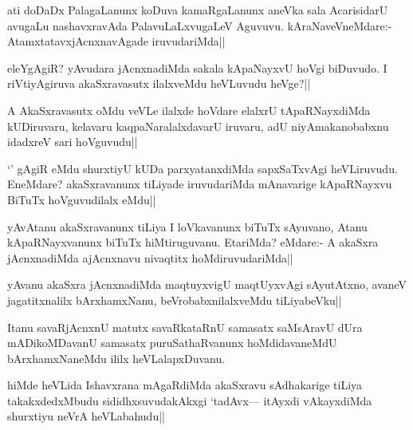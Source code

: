 \stext


\begin{artha}
ati doDaDx PalagaLanunx koDuva kamaRgaLanunx aneVka sala AcarisidarU avugaLu nashavxravAda PalavuLaLxvugaLeV Aguvuvu. kAraNaveVneMdare:- AtamxtatavxjAcnxnavAgade iruvudariMda||
\end{artha}

\begin{artha}
eleYgAgiR? yAvudara jAcnxnadiMda sakala kApaNayxvU hoVgi biDuvudo. I riVtiyAgiruva akaSxravasutx ilalxveMdu heVLuvudu heVge?||
\end{artha}

\begin{artha}
A AkaSxravasutx oMdu veVLe ilalxde hoVdare elalxrU tApaRNayxdiMda kUDiruvaru, kelavaru kaqpaNaralalxdavarU iruvaru, adU niyAmakanobabxnu idadxreV sari hoVguvudu||
\end{artha}

\begin{artha}
`\stext ' gAgiR eMdu shurxtiyU kUDa parxyatanxdiMda sapxSaTxvAgi heVLiruvudu. EneMdare? akaSxravanunx tiLiyade iruvudariMda mAnavarige kApaRNayxvu BiTuTx hoVguvudilalx eMdu||
\end{artha}

\begin{artha}%
yAvAtanu akaSxravanunx tiLiya I loVkavanunx biTuTx sAyuvano, Atanu kApaRNayxvanunx biTuTx hiMtiruguvanu. EtariMda? eMdare:- A akaSxra jAcnxnadiMda ajAcnxnavu nivaqtitx hoMdiruvudariMda||
\end{artha}

\begin{artha}
yAvanu akaSxra jAcnxnadiMda maqtuyxvigU maqtUyxvAgi sAyutAtxno, avaneV jagatitxnalilx bArxhamxNanu, beVrobabxnilalxveMdu tiLiyabeVku||
\end{artha}


\begin{artha}
Itanu savaRjAcnxnU matutx savaRkataRnU samasatx saMsAravU dUra mADikoMDavanU samasatx puruSathaRvanunx hoMdidavaneMdU bArxhamxNaneMdu ililx heVLalapxDuvanu.
\end{artha}

\begin{artha}
hiMde heVLida Ishavxrana mAgaRdiMda akaSxravu sAdhakarige tiLiya takakxdedxMbudu sididhxsuvudakAkxgi `tadAvx--- itAyxdi vAkayxdiMda shurxtiyu neVrA heVLabahudu||
\end{artha}

